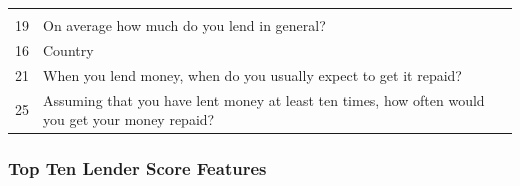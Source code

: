 \begin{longtable}[]{@{}ll@{}}
\begin{minipage}[t]{0.89\columnwidth}
\end{minipage}\tabularnewline
\begin{minipage}[t]{0.05\columnwidth}\raggedright
19\strut
\end{minipage} & \begin{minipage}[t]{0.89\columnwidth}\raggedright
On average how much do you lend in general?\strut
\end{minipage}\tabularnewline
\begin{minipage}[t]{0.05\columnwidth}\raggedright
16\strut
\end{minipage} & \begin{minipage}[t]{0.89\columnwidth}\raggedright
Country\strut
\end{minipage}\tabularnewline
\begin{minipage}[t]{0.05\columnwidth}\raggedright
21\strut
\end{minipage} & \begin{minipage}[t]{0.89\columnwidth}\raggedright
When you lend money, when do you usually expect to get it repaid?\strut
\end{minipage}\tabularnewline
\begin{minipage}[t]{0.05\columnwidth}\raggedright
25\strut
\end{minipage} & \begin{minipage}[t]{0.89\columnwidth}\raggedright
Assuming that you have lent money at least ten times, how often would
you get your money repaid?\strut
\end{minipage}\tabularnewline
\bottomrule
\end{longtable}

\hypertarget{top-ten-lender-score-features}{%
\subsubsection{Top Ten Lender Score
Features}\label{top-ten-lender-score-features}}

